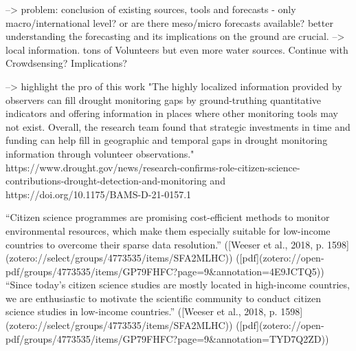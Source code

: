--> problem: conclusion of existing sources, tools and forecasts - only macro/international level? or are there meso/micro forecasts available?
better understanding the forecasting and its implications on the ground are crucial. --> local information. tons of Volunteers but even more water sources. Continue with Crowdsensing? Implications?

--> highlight the pro of this work
"The highly localized information provided by observers can fill drought monitoring gaps by ground-truthing quantitative indicators and offering information in places where other monitoring tools may not exist. Overall, the research team found that strategic investments in time and funding can help fill in geographic and temporal gaps in drought monitoring information through volunteer observations."
https://www.drought.gov/news/research-confirms-role-citizen-science-contributions-drought-detection-and-monitoring and https://doi.org/10.1175/BAMS-D-21-0157.1

“Citizen science programmes are promising cost-efficient methods to monitor environmental resources, which make them especially suitable for low-income countries to overcome their sparse data resolution.” ([Weeser et al., 2018, p. 1598](zotero://select/groups/4773535/items/SFA2MLHC)) ([pdf](zotero://open-pdf/groups/4773535/items/GP79FHFC?page=9&annotation=4E9JCTQ5))
“Since today's citizen science studies are mostly located in high-income countries, we are enthusiastic to motivate the scientific community to conduct citizen science studies in low-income countries.” ([Weeser et al., 2018, p. 1598](zotero://select/groups/4773535/items/SFA2MLHC)) ([pdf](zotero://open-pdf/groups/4773535/items/GP79FHFC?page=9&annotation=TYD7Q2ZD))

